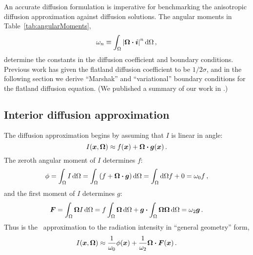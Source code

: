 An accurate diffusion formulation
is imperative for benchmarking the anisotropic diffusion
approximation against diffusion solutions.
The angular moments in Table~\ref{tab:angularMoments},
\begin{equation*}
  \omega_n \equiv \int_\Omega \left| \bm{\Omega} \bm{\cdot} \bm{i} \right|^n \mathop{}\!\mathrm{d} \Omega\,,
\end{equation*}
determine the constants in the diffusion coefficient and boundary conditions.
Previous work has given the flatland diffusion coefficient to be $1/2\sigma$,
and in the following section we derive ``Marshak'' and ``variational'' boundary
conditions for the flatland diffusion equation. (We published a summary of
our work in \cite{Joh2011a}.)

\subsection{Interior diffusion approximation}

The diffusion approximation begins by assuming that $I$ is linear in angle:
\begin{equation*}
  I(\bm{x}, \bm{\Omega}) \approx f(\bm{x}) + \bm{\Omega} \bm{\cdot}
  \bm{g}(\bm{x})\,.
\end{equation*}
The zeroth angular moment of $I$ determines $f$:
\begin{equation*}
  \phi = \int_\Omega I \mathop{}\!\mathrm{d} \Omega
= \int_\Omega \left( f + \bm{\Omega}\bm{\cdot} \bm{g} \right) \mathop{}\!\mathrm{d}\Omega
= \int_\Omega\mathop{}\!\mathrm{d}\Omega f + 0
= \omega_0 f \,,
\end{equation*}
and the first moment of $I$ determines $g$:
\begin{equation*}
  \bm{F} = \int_\Omega \bm{\Omega} I \mathop{}\!\mathrm{d} \Omega
= f \int_\Omega \bm{\Omega} \mathop{}\!\mathrm{d}\Omega
  + \bm{g} \bm{\cdot} \int_\Omega \bm{\Omega}\bm{\Omega} \mathop{}\!\mathrm{d}\Omega
= \omega_2 \bm{g} \,.
\end{equation*}
Thus is the \Pone\ approximation to the radiation intensity in ``general
geometry'' form,
\begin{equation}\label{eq:ssPone}
  I(\bm{x}, \bm{\Omega})
  \approx \frac{1}{\omega_0} \phi(\bm{x})
  + \frac{1}{\omega_2} \bm{\Omega} \bm{\cdot} \bm{F}(\bm{x})\,.
\end{equation}

